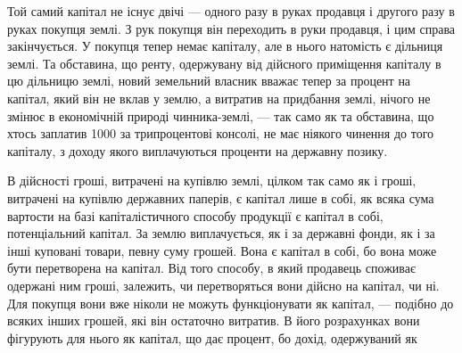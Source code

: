 Той самий капітал не існує двічі — одного разу в руках продавця і другого
разу в руках покупця землі. З рук покупця він переходить в руки продавця,
і цим справа закінчується. У покупця тепер немає капіталу, але в нього
натомість є дільниця землі. Та обставина, що ренту, одержувану від дійсного
приміщення капіталу в цю дільницю землі, новий земельний власник вважає
тепер за процент на капітал, який він не вклав у землю, а витратив на придбання
землі, нічого не змінює в економічній природі чинника-землі, — так само
як та обставина, що хтось заплатив 1000 за трипроцентові консолі,
не має ніякого чинення до того капіталу, з доходу якого виплачуються проценти
на державну позику.

В дійсності гроші, витрачені на купівлю землі, цілком так само як і
гроші, витрачені на купівлю державних паперів, є капітал лише в собі, як
всяка сума вартости на базі капіталістичного способу продукції є капітал в собі,
потенціальний капітал. За землю виплачується, як і за державні фонди, як і
за інші куповані товари, певну суму грошей. Вона є капітал в собі, бо вона
може бути перетворена на капітал. Від того способу, в який продавець споживає
одержані ним гроші, залежить, чи перетворяться вони дійсно на капітал, чи ні.
Для покупця вони вже ніколи не можуть функціонувати як капітал, — подібно
до всяких інших грошей, які він остаточно витратив. В його розрахунках вони
фігурують для нього як капітал, що дає процент, бо дохід, одержуваний як
\parbreak{}  %
